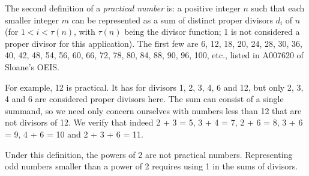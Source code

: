 \documentclass[12pt]{article}
\begin{document}
The second definition of a {\em practical number} is: a positive integer $n$ such that each smaller integer $m$ can be represented as a sum of distinct proper divisors $d_i$ of $n$ (for $1 < i < \tau(n)$, with $\tau(n)$ being the divisor function; 1 is not considered a proper divisor for this application). The first few are 6, 12, 18, 20, 24, 28, 30, 36, 40, 42, 48, 54, 56, 60, 66, 72, 78, 80, 84, 88, 90, 96, 100, etc., listed in A007620 of Sloane's OEIS.

For example, 12 is practical. It has for divisors 1, 2, 3, 4, 6 and 12, but only 2, 3, 4 and 6 are considered proper divisors here. The sum can consist of a single summand, so we need only concern ourselves with numbers less than 12 that are not divisors of 12. We verify that indeed 2 + 3 = 5, 3 + 4 = 7, 2 + 6 = 8, 3 + 6 = 9, 4 + 6 = 10 and 2 + 3 + 6 = 11.

Under this definition, the powers of 2 are not practical numbers. Representing odd numbers smaller than a power of 2 requires using 1 in the sums of divisors.
\end{document}
